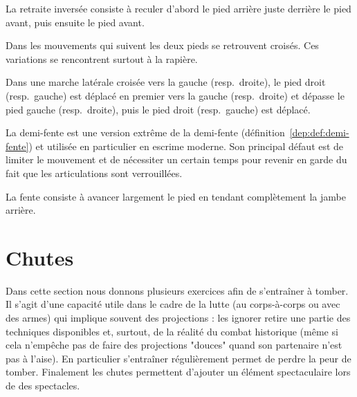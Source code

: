 \begin{definition}

La retraite inversée consiste à reculer d'abord le pied arrière juste derrière le pied avant, puis ensuite le pied avant.
\end{definition}


Dans les mouvements qui suivent les deux pieds se retrouvent croisés.
Ces variations se rencontrent surtout à la rapière.

\begin{definition}

Dans une marche latérale croisée vers la gauche (resp.\ droite), le pied droit (resp.\ gauche) est déplacé en premier vers la gauche (resp.\ droite) et dépasse le pied gauche (resp.\ droite), puis le pied droit (resp.\ gauche) est déplacé.
\end{definition}


La demi-fente est une version extrême de la demi-fente (définition~\ref{dep:def:demi-fente}) et utilisée en particulier en escrime moderne.
Son principal défaut est de limiter le mouvement et de nécessiter un certain temps pour revenir en garde du fait que les articulations sont verrouillées.


\begin{definition}[Fente]

La fente consiste à avancer largement le pied en tendant complètement la jambe arrière.
\end{definition}




\section{Chutes}


Dans cette section nous donnons plusieurs exercices afin de s'entraîner à tomber.
Il s'agit d'une capacité utile dans le cadre de la lutte (au corps-à-corps ou avec des armes) qui implique souvent des projections : les ignorer retire une partie des techniques disponibles et, surtout, de la réalité du combat historique (même si cela n'empêche pas de faire des projections "douces" quand son partenaire n'est pas à l'aise).
En particulier s'entraîner régulièrement permet de perdre la peur de tomber.
Finalement les chutes permettent d'ajouter un élément spectaculaire lors de des spectacles.


